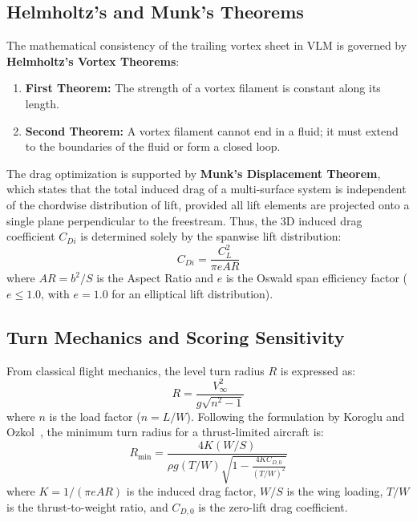 \documentclass[11pt]{article}
\begin{document}
\subsection{Helmholtz's and Munk's Theorems}
The mathematical consistency of the trailing vortex sheet in VLM is governed by \textbf{Helmholtz's Vortex Theorems}:
\begin{enumerate}
    \item \textbf{First Theorem:} The strength of a vortex filament is constant along its length.
    \item \textbf{Second Theorem:} A vortex filament cannot end in a fluid; it must extend to the boundaries of the fluid or form a closed loop. 
\end{enumerate}

The drag optimization is supported by \textbf{Munk's Displacement Theorem}, which states that the total induced drag of a multi-surface system is independent of the chordwise distribution of lift, provided all lift elements are projected onto a single plane perpendicular to the freestream. Thus, the 3D induced drag coefficient $C_{Di}$ is determined solely by the spanwise lift distribution:
\begin{equation}
    C_{Di} = \frac{C_L^2}{\pi e AR}
\end{equation}
where $AR = b^2/S$ is the Aspect Ratio and $e$ is the Oswald span efficiency factor ($e \le 1.0$, with $e=1.0$ for an elliptical lift distribution).

\subsection{Turn Mechanics and Scoring Sensitivity}
From classical flight mechanics, the level turn radius $R$ is expressed as:
\begin{equation}
    R = \frac{V_{\infty}^2}{g \sqrt{n^2 - 1}}
\end{equation}
where $n$ is the load factor ($n = L/W$). Following the formulation by Koroglu and Ozkol~\cite{koroglu2019}, the minimum turn radius for a thrust-limited aircraft is:
\begin{equation}
    R_{\text{min}} = \frac{4 K (W/S)}{\rho g (T/W) \sqrt{1 - \frac{4 K C_{D,0}}{(T/W)^2}}}
\end{equation}
where $K = 1 / (\pi e AR)$ is the induced drag factor, $W/S$ is the wing loading, $T/W$ is the thrust-to-weight ratio, and $C_{D,0}$ is the zero-lift drag coefficient.
\end{document}
